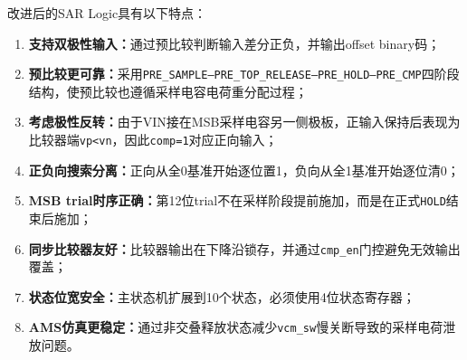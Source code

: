 改进后的SAR Logic具有以下特点：
\begin{enumerate}[label=(\arabic*)]
    \item \textbf{支持双极性输入：}通过预比较判断输入差分正负，并输出offset binary码；
    \item \textbf{预比较更可靠：}采用\texttt{PRE\_SAMPLE--PRE\_TOP\_RELEASE--PRE\_HOLD--PRE\_CMP}四阶段结构，使预比较也遵循采样电容电荷重分配过程；
    \item \textbf{考虑极性反转：}由于VIN接在MSB采样电容另一侧极板，正输入保持后表现为比较器端\texttt{vp<vn}，因此\texttt{comp=1}对应正向输入；
    \item \textbf{正负向搜索分离：}正向从全0基准开始逐位置1，负向从全1基准开始逐位清0；
    \item \textbf{MSB trial时序正确：}第12位trial不在采样阶段提前施加，而是在正式\texttt{HOLD}结束后施加；
    \item \textbf{同步比较器友好：}比较器输出在下降沿锁存，并通过\texttt{cmp\_en}门控避免无效输出覆盖；
    \item \textbf{状态位宽安全：}主状态机扩展到10个状态，必须使用4位状态寄存器；
    \item \textbf{AMS仿真更稳定：}通过非交叠释放状态减少\texttt{vcm\_sw}慢关断导致的采样电荷泄放问题。
\end{enumerate}
